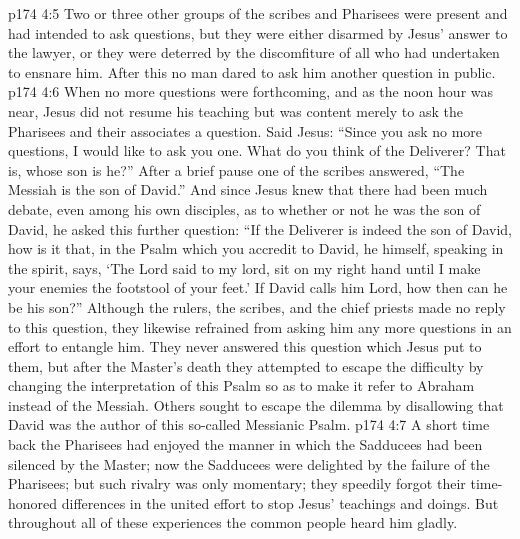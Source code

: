 \vs p174 4:5 \pc Two or three other groups of the scribes and Pharisees were present and had intended to ask questions, but they were either disarmed by Jesus’ answer to the lawyer, or they were deterred by the discomfiture of all who had undertaken to ensnare him. After this no man dared to ask him another question in public.
\vs p174 4:6 When no more questions were forthcoming, and as the noon hour was near, Jesus did not resume his teaching but was content merely to ask the Pharisees and their associates a question. Said Jesus: \textcolor{ubdarkred}{“Since you ask no more questions, I would like to ask you one. What do you think of the Deliverer? That is, whose son is he?”} After a brief pause one of the scribes answered, “The Messiah is the son of David.” And since Jesus knew that there had been much debate, even among his own disciples, as to whether or not he was the son of David, he asked this further question: \textcolor{ubdarkred}{“If the Deliverer is indeed the son of David, how is it that, in the Psalm which you accredit to David, he himself, speaking in the spirit, says, ‘The Lord said to my lord, sit on my right hand until I make your enemies the footstool of your feet.’ If David calls him Lord, how then can he be his son?”} Although the rulers, the scribes, and the chief priests made no reply to this question, they likewise refrained from asking him any more questions in an effort to entangle him. They never answered this question which Jesus put to them, but after the Master’s death they attempted to escape the difficulty by changing the interpretation of this Psalm so as to make it refer to Abraham instead of the Messiah. Others sought to escape the dilemma by disallowing that David was the author of this so\hyp{}called Messianic Psalm.
\vs p174 4:7 A short time back the Pharisees had enjoyed the manner in which the Sadducees had been silenced by the Master; now the Sadducees were delighted by the failure of the Pharisees; but such rivalry was only momentary; they speedily forgot their time\hyp{}honored differences in the united effort to stop Jesus’ teachings and doings. But throughout all of these experiences the common people heard him gladly.
